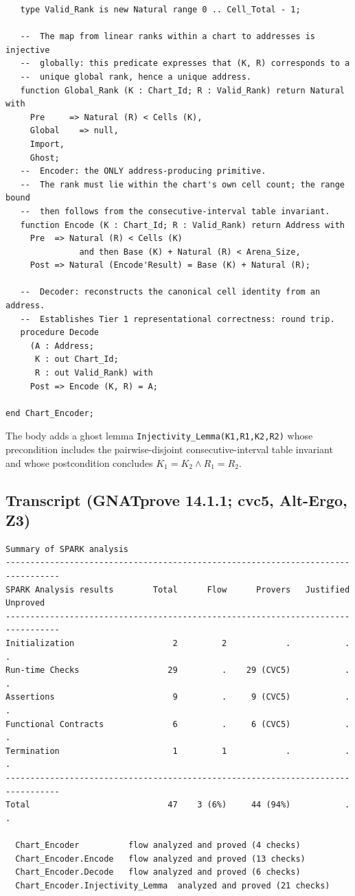 \documentclass[11pt]{article}
\begin{document}
\begin{verbatim}
   type Valid_Rank is new Natural range 0 .. Cell_Total - 1;

   --  The map from linear ranks within a chart to addresses is injective
   --  globally: this predicate expresses that (K, R) corresponds to a
   --  unique global rank, hence a unique address.
   function Global_Rank (K : Chart_Id; R : Valid_Rank) return Natural with
     Pre     => Natural (R) < Cells (K),
     Global    => null,
     Import,
     Ghost;
   --  Encoder: the ONLY address-producing primitive.
   --  The rank must lie within the chart's own cell count; the range bound
   --  then follows from the consecutive-interval table invariant.
   function Encode (K : Chart_Id; R : Valid_Rank) return Address with
     Pre  => Natural (R) < Cells (K)
               and then Base (K) + Natural (R) < Arena_Size,
     Post => Natural (Encode'Result) = Base (K) + Natural (R);

   --  Decoder: reconstructs the canonical cell identity from an address.
   --  Establishes Tier 1 representational correctness: round trip.
   procedure Decode
     (A : Address;
      K : out Chart_Id;
      R : out Valid_Rank) with
     Post => Encode (K, R) = A;

end Chart_Encoder;
\end{verbatim}

\noindent The body adds a ghost lemma \texttt{Injectivity\_Lemma(K1,R1,K2,R2)} whose
precondition includes the pairwise-disjoint consecutive-interval table invariant and
whose postcondition concludes $K_1=K_2 \wedge R_1=R_2$.

\subsection{Transcript (GNATprove 14.1.1; cvc5, Alt-Ergo, Z3)}

\begin{verbatim}
Summary of SPARK analysis
---------------------------------------------------------------------------------
SPARK Analysis results        Total      Flow      Provers   Justified   Unproved
---------------------------------------------------------------------------------
Initialization                    2         2            .           .          .
Run-time Checks                  29         .    29 (CVC5)           .          .
Assertions                        9         .     9 (CVC5)           .          .
Functional Contracts              6         .     6 (CVC5)           .          .
Termination                       1         1            .           .          .
---------------------------------------------------------------------------------
Total                            47    3 (6%)     44 (94%)           .          .

  Chart_Encoder          flow analyzed and proved (4 checks)
  Chart_Encoder.Encode   flow analyzed and proved (13 checks)
  Chart_Encoder.Decode   flow analyzed and proved (6 checks)
  Chart_Encoder.Injectivity_Lemma  analyzed and proved (21 checks)
\end{verbatim}
\end{document}
